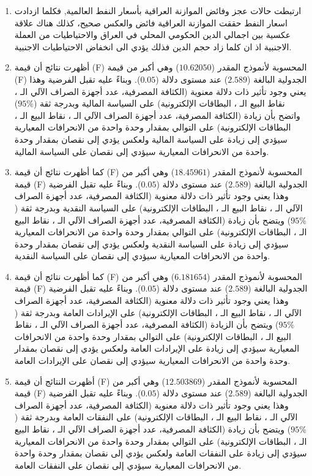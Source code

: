 \documentclass[10pt,a4paper]{report}
\begin{document}
\begin{doublespacing}
\begin{enumerate}
	\item ارتبطت حالات عجز وفائض الموازنة العراقية بأسعار النفط العالمية, فكلما ازدادت اسعار النفط حققت الموازنة العراقية فائض والعكس صحيح، كذلك هناك علاقة عكسية بين اجمالي الدين الحكومي المحلي في العراق والاحتياطيات من العملة الاجنبية اذ ان كلما زاد حجم الدين فذلك يؤدي الى انخفاض الاحتياطيات الاجنبية.
	\item أظهرت نتائج أن قيمة (F) المحسوبة لأنموذج المقدر ($10.62050$) وهي أكبر من قيمة (F) الجدولية البالغة ($2.589$) عند مستوى دلالة ($0.05$). وبناءً عليه تقبل الفرضية وهذا يعني وجود تأثير ذات دلالة معنوية (الكثافة المصرفية، عدد أجهزة الصراف الآلي الـ ، نقاط البيع الـ ، البطاقات الإلكترونية) على السياسة المالية وبدرجة ثقة ($95\%$) واتضح بأن زيادة (الكثافة المصرفية، عدد أجهزة الصراف الآلي الـ ، نقاط البيع الـ ، البطاقات الإلكترونية) على التوالي بمقدار وحدة واحدة من الانحرافات المعيارية سيؤدي إلى زيادة على السياسة المالية ولعكس يؤدي إلى نقصان بمقدار وحدة واحدة من الانحرافات المعيارية سيؤدي إلى نقصان على السياسة المالية.
	\item كما أظهرت نتائج أن قيمة (F) المحسوبة لأنموذج المقدر ($18.45961$) وهي أكبر من قيمة (F) الجدولية البالغة ($2.589$) عند مستوى دلالة ($0.05$). وبناءً عليه تقبل الفرضية وهذا يعني وجود تأثير ذات دلالة معنوية (الكثافة المصرفية، عدد أجهزة الصراف الآلي الـ ، نقاط البيع الـ ، البطاقات الإلكترونية) على السياسة النقدية وبدرجة ثقة ($95\%$) ويتضح بأن زيادة (الكثافة المصرفية، عدد أجهزة الصراف الآلي الـ ، نقاط البيع الـ ، البطاقات الإلكترونية) على التوالي بمقدار وحدة واحدة من الانحرافات المعيارية سيؤدي إلى زيادة على السياسة النقدية ولعكس يؤدي إلى نقصان بمقدار وحدة واحدة من الانحرافات المعيارية سيؤدي إلى نقصان على السياسة النقدية.
	\item كما أظهرت نتائج أن قيمة (F) المحسوبة لأنموذج المقدر ($6.181654$) وهي أكبر من قيمة (F) الجدولية البالغة ($2.589$) عند مستوى دلالة ($0.05$). وبناءً عليه تقبل الفرضية وهذا يعني وجود تأثير ذات دلالة معنوية (الكثافة المصرفية، عدد أجهزة الصراف الآلي الـ ، نقاط البيع الـ ، البطاقات الإلكترونية) على الإيرادات العامة وبدرجة ثقة ($95\%$) ويتضح بأن الزيادة (الكثافة المصرفية، عدد أجهزة الصراف الآلي الـ ، نقاط البيع الـ ، البطاقات الإلكترونية) على التوالي بمقدار وحدة واحدة من الانحرافات المعيارية سيؤدي إلى زيادة على الإيرادات العامة ولعكس يؤدي إلى نقصان بمقدار وحدة واحدة من الانحرافات المعيارية سيؤدي إلى نقصان على الإيرادات العامة.
	\item أظهرت النتائج أن قيمة (F) المحسوبة لأنموذج المقدر ($12.503869$) وهي أكبر من قيمة (F) الجدولية البالغة ($2.589$) عند مستوى دلالة ($0.05$). وبناءً عليه تقبل الفرضية وهذا يعني وجود تأثير ذات دلالة معنوية (الكثافة المصرفية، عدد أجهزة الصراف الآلي الـ ، نقاط البيع الـ ، البطاقات الإلكترونية) على النفقات العامة وبدرجة ثقة ($95\%$) ويتضح بأن زيادة (الكثافة المصرفية، عدد أجهزة الصراف الآلي الـ ، نقاط البيع الـ ، البطاقات الإلكترونية) على التوالي بمقدار وحدة واحدة من الانحرافات المعيارية سيؤدي إلى زيادة على النفقات العامة ولعكس يؤدي إلى نقصان بمقدار وحدة واحدة من الانحرافات المعيارية سيؤدي إلى نقصان على النفقات العامة.

\end{enumerate}
\end{doublespacing}
\end{document}
